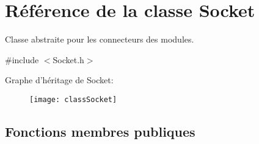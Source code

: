 \hypertarget{classSocket}{\section{Référence de la classe Socket}
\label{classSocket}
}


Classe abstraite pour les connecteurs des modules.  




{\ttfamily \#include $<$Socket.\-h$>$}

Graphe d'héritage de Socket\-:\begin{figure}[H]
\begin{center}
\leavevmode
\texttt{[image: classSocket]}
\end{center}
\end{figure}
\subsection*{Fonctions membres publiques}
